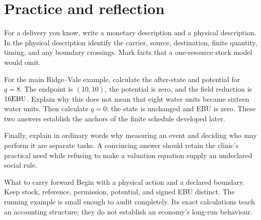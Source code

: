 \section{Practice and reflection}
For a delivery you know, write a monetary description and a physical description. In the physical description identify the carrier, source, destination, finite quantity, timing, and any boundary crossings. Mark facts that a one-resource stock model would omit.

For the main Ridge--Vale example, calculate the after-state and potential for \(q=8\). The endpoint is \((10,10)\), the potential is zero, and the field reduction is \(16\mathrm{EBU}\). Explain why this does not mean that eight water units became sixteen water units. Then calculate \(q=0\): the state is unchanged and EBU is zero. These two answers establish the anchors of the finite schedule developed later.

Finally, explain in ordinary words why measuring an event and deciding who may perform it are separate tasks. A convincing answer should retain the clinic's practical need while refusing to make a valuation equation supply an undeclared social rule.

\begin{intuitionbox}{What to carry forward}
Begin with a physical action and a declared boundary. Keep stock, reference, permission, potential, and signed EBU distinct. The running example is small enough to audit completely. Its exact calculations teach an accounting structure; they do not establish an economy's long-run behaviour.
\end{intuitionbox}
